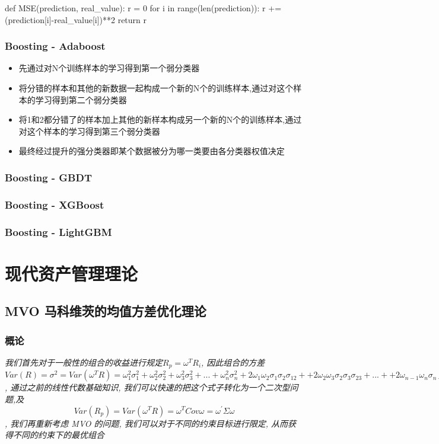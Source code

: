 \documentclass{scrartcl}
\numberwithin{equation}{section}   %
\begin{document}
\begin{python}
def MSE(prediction, real_value):
    r = 0
    for i in range(len(prediction)):
        r += (prediction[i]-real_value[i])**2
    return r
\end{python}
\subsubsection{Boosting - Adaboost}
\begin{itemize}
    \item 先通过对N个训练样本的学习得到第一个弱分类器
    \item 将分错的样本和其他的新数据一起构成一个新的N个的训练样本,通过对这个样本的学习得到第二个弱分类器
    \item 将1和2都分错了的样本加上其他的新样本构成另一个新的N个的训练样本,通过对这个样本的学习得到第三个弱分类器
    \item  最终经过提升的强分类器即某个数据被分为哪一类要由各分类器权值决定
\end{itemize}

\subsubsection{Boosting - GBDT}

\subsubsection{Boosting - XGBoost}
\subsubsection{Boosting - LightGBM}

\section{现代资产管理理论}
\subsection{MVO 马科维茨的均值方差优化理论}
\subsubsection{概论}
\textsl{
    我们首先对于一般性的组合的收益进行规定$R_p =  \omega^T R_i$, 因此组合的方差 $Var(R) = \sigma^2= Var(\omega^T R) = \omega_1^2\sigma_1^2 + \omega_2^2\sigma_2^2+  \omega_3^2\sigma_3^2+ ... +  \omega_n^2\sigma_n^2 + 2  \omega_1\omega_2\sigma_1\sigma_2\sigma_{12}+ + 2  \omega_2\omega_3\sigma_2\sigma_3\sigma_{23} + ... + + 2  \omega_{n-1}\omega_n\sigma_{n-1}\sigma_n\sigma_{n-1, n}$, 通过之前的线性代数基础知识, 我们可以快速的把这个式子转化为一个二次型问题,及$$Var(R_p) = Var(\omega^T R) = \omega^T Cov \omega= \omega^{'}  \Sigma \omega $$, 我们再重新考虑 MVO 的问题, 我们可以对于不同的约束目标进行限定, 从而获得不同的约束下的最优组合}
\end{document}
